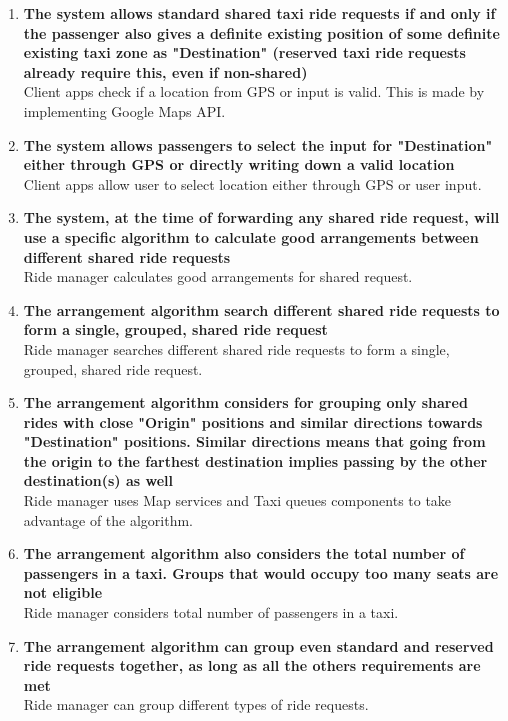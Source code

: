\begin{enumerate}
	\item \textbf{The system allows standard shared taxi ride requests if and only if the passenger also gives a definite existing position of some definite existing taxi zone as "Destination" (reserved taxi ride requests already require this, even if non-shared)}\\
	Client apps check if a location from GPS or input is valid. This is made by implementing Google Maps API.
	
	\item \textbf{The system allows passengers to select the input for "Destination" either through GPS or directly writing down a valid location}\\
	Client apps allow user to select location either through GPS or user input.	
	
	\item \textbf{The system, at the time of forwarding any shared ride request, will use a specific algorithm to calculate good arrangements between different shared ride requests}\\
	Ride manager calculates good arrangements for shared request.
	
	\item \textbf{The arrangement algorithm search different shared ride requests to form a single, grouped, shared ride request}\\
	Ride manager searches different shared ride requests to form a single, grouped, shared ride request. 
	
	\item \textbf{The arrangement algorithm considers for grouping only shared rides with close "Origin" positions and similar directions towards "Destination" positions. Similar directions means that going from the origin to the farthest destination implies passing by the other destination(s) as well}\\
	Ride manager uses Map services and Taxi queues components to take advantage of the algorithm. 
	
	\item \textbf{The arrangement algorithm also considers the total number of passengers in a taxi. Groups that would occupy too many seats are not eligible}\\
	Ride manager considers total number of passengers in a taxi.
	
	\item \textbf{The arrangement algorithm can group even standard and reserved ride requests together, as long as all the others requirements are met}\\
	Ride manager can group different types of ride requests. 
	

\end{enumerate}
